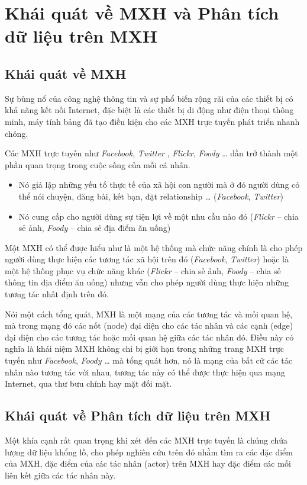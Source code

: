 \documentclass[12pt]{extarticle}
\begin{document}
	\section{Khái quát về MXH và Phân tích dữ liệu trên MXH}
		\subsection{Khái quát về MXH}
			\par Sự bùng nổ của công nghệ thông tin và sự phổ biến rộng rãi của các thiết bị có khả năng kết nối Internet, đặc biệt là các thiết bị di động như điện thoại thông minh, máy tính bảng đã tạo điều kiện cho các MXH trực tuyến phát triển nhanh chóng.
			\par Các MXH trực tuyến như \textit{Facebook}, \textit{Twitter} , \textit{Flickr}, \textit{Foody} … dần trở thành một phần quan trọng trong cuộc sống của mỗi cá nhân.
			\begin{itemize}
				\item{Nó giả lập những yếu tố thực tế của xã hội con người mà ở đó người dùng có thể nói chuyện, đăng bài, kết bạn, đặt relationship … (\textit{Facebook}, \textit{Twitter})}	
				\item{Nó cung cấp cho người dùng sự tiện lợi về một nhu cầu nào đó (\textit{Flickr} – chia sẻ ảnh, \textit{Foody}  – chia sẻ địa điểm ăn uống)}
			\end{itemize}

			\par Một MXH có thể được hiểu như là một hệ thống mà chức năng chính là cho phép người dùng thực hiện các tương tác xã hội trên đó (\textit{Facebook}, \textit{Twitter}) hoặc là một hệ thống phục vụ chức năng khác (\textit{Flickr} – chia sẻ ảnh, \textit{Foody}  – chia sẻ thông tin địa điểm ăn uống) nhưng vẫn cho phép người dùng thực hiện những tương tác nhất định trên đó. 
			\par Nói một cách tổng quát, MXH là một mạng của các tương tác và mối quan hệ, mà trong mạng đó các nốt (node) đại diện cho các tác nhân và các cạnh (edge) đại diện cho các tương tác hoặc mối quan hệ giữa các tác nhân đó. Điều này có nghĩa là khái niệm MXH không chỉ bị giới hạn trong những trang MXH trực tuyến như \textit{Facebook}, \textit{Foody} … mà tổng quát hơn, nó là mạng của bất cứ các tác nhân nào tương tác với nhau, tương tác này có thể được thực hiện qua mạng Internet, qua thư bưu chính hay mặt đối mặt.

		\subsection{Khái quát về Phân tích dữ liệu trên MXH}
			\par Một khía cạnh rất quan trọng khi xét đến các MXH trực tuyến là chúng chứa lượng dữ liệu khổng lồ, cho phép nghiên cứu trên đó nhằm tìm ra các đặc điểm của MXH, đặc điểm của các tác nhân (actor) trên MXH hay đặc điểm các mối liên kết giữa các tác nhân này.
\end{document}

